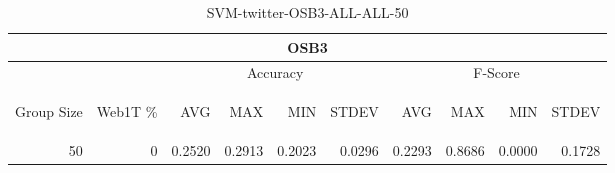 \begin{center}
\begin{table}[htbp] 
 \begin{center}
\begin{tabular}{ | r | r | r | r | r | r | r | r | r | r |}
\hline
\multicolumn{10}{|c|}{OSB3}\\
\hline
 & & \multicolumn{4}{|c|}{Accuracy} & \multicolumn{4}{|c|}{F-Score}\\ \cline{3-10}
\begin{sideways}Group Size\end{sideways} & \begin{sideways}Web1T \%\end{sideways} & \begin{sideways}AVG\end{sideways} & \begin{sideways}MAX\end{sideways} & \begin{sideways}MIN\end{sideways} & \begin{sideways}STDEV\end{sideways} & \begin{sideways}AVG\end{sideways} & \begin{sideways}MAX\end{sideways} & \begin{sideways}MIN\end{sideways} & \begin{sideways}STDEV\end{sideways}\\
\hline
\multirow{0}{*}{50}
 & 0 & 0.2520 & 0.2913 & 0.2023 & 0.0296 & 0.2293 & 0.8686 & 0.0000 & 0.1728\\ \cline{2-10}
\hline
\end{tabular}
\caption{SVM-twitter-OSB3-ALL-ALL-50}
\label{table:SVM-twitter-OSB3-ALL-ALL-50}
\end{center}
 \end{table}
\end{center}

